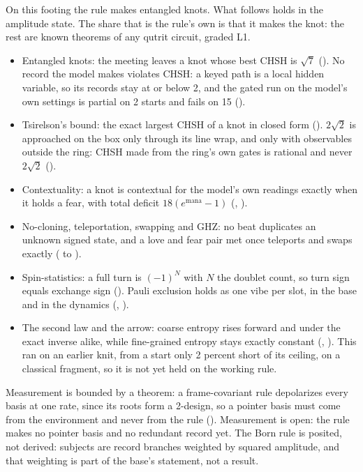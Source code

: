 On this footing the rule makes entangled knots. What follows holds in the amplitude state. The share that is the
rule's own is that it makes the knot: the rest are known theorems of any qutrit circuit, graded L1.
\begin{itemize}
\item Entangled knots: the meeting leaves a knot whose best CHSH is $\sqrt7$ (). No record the model
makes violates CHSH: a keyed path is a local hidden variable, so its records stay at or below 2, and the gated run
on the model's own settings is partial on 2 starts and fails on 15 ().
\item Tsirelson's bound: the exact largest CHSH of a knot in closed form (). $2\sqrt2$ is approached
on the box only through its line wrap, and only with observables outside the ring: CHSH made from the ring's own
gates is rational and never $2\sqrt2$ ().
\item Contextuality: a knot is contextual for the model's own readings exactly when it holds a fear, with total
deficit $18(e^{\text{mana}} - 1)$ (, ).
\item No-cloning, teleportation, swapping and GHZ: no beat duplicates an unknown signed state, and a love and fear
pair met once teleports and swaps exactly ( to ).
\item Spin-statistics: a full turn is $(-1)^N$ with $N$ the doublet count, so turn sign equals exchange sign
(). Pauli exclusion holds as one vibe per slot, in the base and in the dynamics
(, ).
\item The second law and the arrow: coarse entropy rises forward and under the exact inverse alike, while
fine-grained entropy stays exactly constant (, ). This ran on an earlier knit, from
a start only 2 percent short of its ceiling, on a classical fragment, so it is not yet held on the working rule.
\end{itemize}

Measurement is bounded by a theorem: a frame-covariant rule depolarizes every basis at one rate, since its roots form
a 2-design, so a pointer basis must come from the environment and never from the rule ().
Measurement is open: the rule makes no pointer basis and no redundant record yet. The Born rule is posited, not
derived: subjects are record branches weighted by squared amplitude, and that weighting is part of the base's
statement, not a result.
